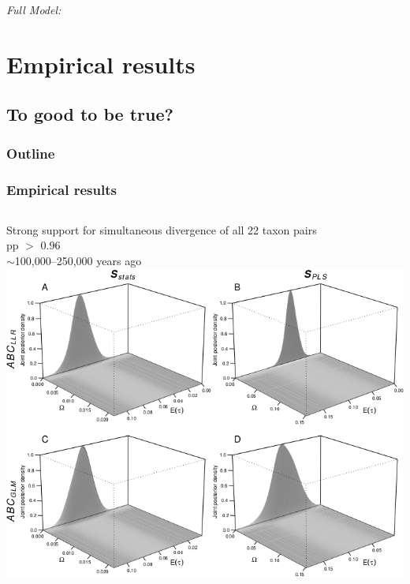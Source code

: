 \begin{frame}[t]
\begin{onlyenv}
\begin{block}{\it Full Model:}
    \end{block}
    \end{onlyenv}
\end{frame}

\section{Empirical results}
\subsection{To good to be true?}

\begin{frame}
\frametitle{Outline}
\end{frame}

\begin{frame}
    \frametitle{Empirical results}
    \begin{columns}[c]
            {\small
            Strong support for simultaneous divergence of all 22 taxon pairs \\
            \vspace{1cm}
            pp $>$ 0.96 \\
            \vspace{1cm}
            $\sim$100,000--250,000 years ago}
        \includegraphics[width=\textwidth]{images/jointDensityPlots.jpg}
    \end{columns}
\end{frame}

